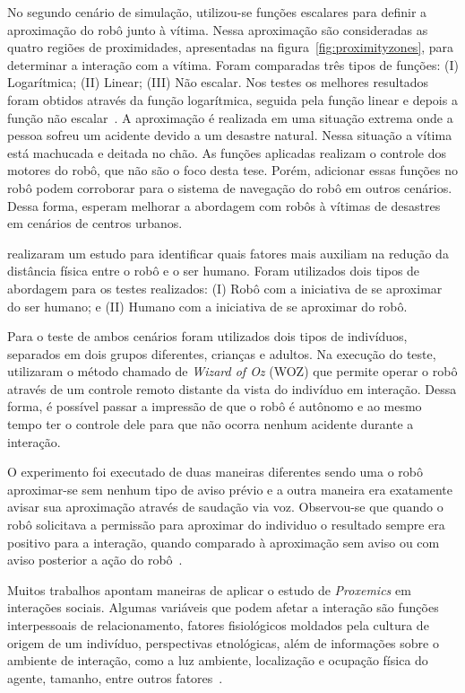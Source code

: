 No segundo cenário de simulação, utilizou-se funções escalares para definir a aproximação do robô junto à vítima. Nessa aproximação são consideradas as quatro regiões de proximidades, apresentadas na figura~\ref{fig:proximityzones}, para determinar a interação com a vítima. Foram comparadas três tipos de funções: (I) Logarítmica; (II) Linear; (III) Não escalar. Nos testes os melhores resultados foram obtidos através da função logarítmica, seguida pela função linear e depois a função não escalar~\cite{srinivasan:2012}. A aproximação é realizada em uma situação extrema onde a pessoa sofreu um acidente devido a um desastre natural. Nessa situação a vítima está machucada e deitada no chão. As funções aplicadas realizam o controle dos motores do robô, que não são o foco desta tese. Porém, adicionar essas funções no robô podem corroborar para o sistema de navegação do robô em outros cenários. Dessa forma, \textcite{srinivasan:2012} esperam melhorar a abordagem com robôs à vítimas de desastres em cenários de centros urbanos.

\textcite{okita:2012} realizaram um estudo para identificar quais fatores mais auxiliam na redução da distância física entre o robô e o ser humano. Foram utilizados dois tipos de abordagem para os testes realizados: (I) Robô com a iniciativa de se aproximar do ser humano; e (II) Humano com a iniciativa de se aproximar do robô.

Para o teste de ambos cenários foram utilizados dois tipos de indivíduos, separados em dois grupos diferentes, crianças e adultos. Na execução do teste, \textcite{okita:2012} utilizaram o método chamado de \emph{Wizard of Oz} (WOZ) que permite operar o robô através de um controle remoto distante da vista do indivíduo em interação. Dessa forma, é possível passar a impressão de que o robô é autônomo e ao mesmo tempo ter o controle dele para que não ocorra nenhum acidente durante a interação.

O experimento foi executado de duas maneiras diferentes sendo uma o robô aproximar-se sem nenhum tipo de aviso prévio e a outra maneira era exatamente avisar sua aproximação através de saudação via voz. Observou-se que quando o robô solicitava a permissão para aproximar do individuo o resultado sempre era positivo para a interação, quando comparado à aproximação sem aviso ou com aviso posterior a ação do robô~\cite{okita:2012}.

Muitos trabalhos apontam maneiras de aplicar o estudo de \emph{Proxemics} em interações sociais. Algumas variáveis que podem afetar a interação são funções interpessoais de relacionamento, fatores fisiológicos moldados pela cultura de origem de um indivíduo, perspectivas etnológicas, além de informações sobre o ambiente de interação, como a luz ambiente, localização e ocupação física do agente, tamanho, entre outros fatores~\cite{mead:2011b}.

